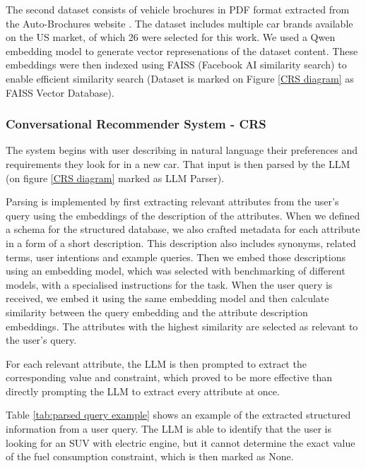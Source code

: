 \documentclass[fleqn,moreauthors,10pt]{ds_report}
\begin{document}
The second dataset consists of vehicle brochures in PDF format
extracted from the Auto-Brochures website \cite{autobrochuers}. 
The dataset includes 
multiple car brands available on the US market, of which 26 were selected 
for this work. We used a Qwen embedding model to generate vector 
represenations of the dataset content. These embeddings were then 
indexed using FAISS (Facebook AI similarity search) \cite{faiss}
to enable efficient similarity search (Dataset
is marked on Figure \ref{CRS diagram} as FAISS Vector Database).


\subsubsection*{Conversational Recommender System - CRS}

The system begins with user describing in natural language their preferences and requirements 
they look for in a new car. That input is then parsed by the LLM (on figure 
\ref{CRS diagram} marked as LLM Parser). 

Parsing is implemented by first extracting relevant attributes from the user's query using the embeddings of the description of the attributes. When we defined a schema for the structured database, we also crafted metadata for each attribute in a form of a short description. This description also includes synonyms, related terms, user intentions and example queries. Then we embed those descriptions using an embedding model, which was selected with benchmarking of different models, with a specialised instructions for the task. When the user query is received, we embed it using the same embedding model and then calculate similarity between the query embedding and the attribute description embeddings. The attributes with the highest similarity are selected as relevant to the user's query.

For each relevant attribute, the LLM is then prompted to extract the corresponding value and constraint, which proved to be more effective than directly prompting the LLM to extract every attribute at once. 

Table \ref{tab:parsed query example} shows an example of the extracted structured information from a user query. The LLM is able to identify that the user is looking for an SUV with electric engine, but it cannot determine the exact value of the fuel consumption constraint, which is then marked as None.
\end{document}
